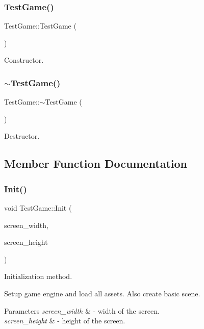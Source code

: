 \subsubsection{\texorpdfstring{TestGame()}{TestGame()}}
{\footnotesize\ttfamily Test\+Game\+::\+Test\+Game (\begin{DoxyParamCaption}{ }\end{DoxyParamCaption})}



Constructor. 

\mbox{\label{class_test_game_ac0b3267478f7d6ccea98338d3f1dee1a}} 
\subsubsection{\texorpdfstring{$\sim$TestGame()}{~TestGame()}}
{\footnotesize\ttfamily Test\+Game\+::$\sim$\+Test\+Game (\begin{DoxyParamCaption}{ }\end{DoxyParamCaption})}



Destructor. 



\subsection{Member Function Documentation}
\mbox{\label{class_test_game_aabd73405594a1ee0f0d312fe4e1eb237}} 
\subsubsection{\texorpdfstring{Init()}{Init()}}
{\footnotesize\ttfamily void Test\+Game\+::\+Init (\begin{DoxyParamCaption}\item[{G\+Luint}]{screen\+\_\+width,  }\item[{G\+Luint}]{screen\+\_\+height }\end{DoxyParamCaption})}



Initialization method. 

Setup game engine and load all assets. Also create basic scene. 
\begin{DoxyParams}{Parameters}
{\em screen\+\_\+width} & -\/ width of the screen. \\
\hline
{\em screen\+\_\+height} & -\/ height of the screen. \\
\hline
\end{DoxyParams}
\mbox{\label{class_test_game_a302728c6fe309b522e4f10fcb2f55baf}} 
